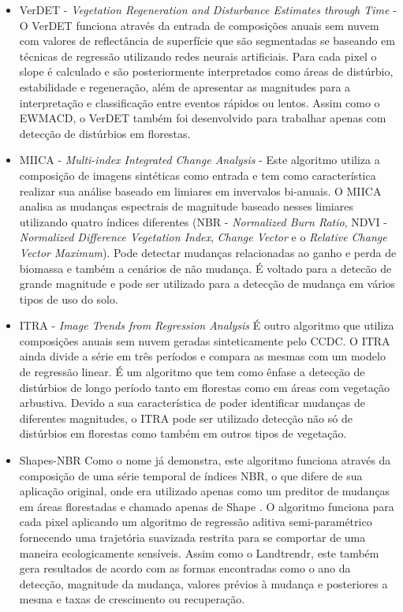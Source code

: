 \documentclass[12pt,a4paper]{article}
\begin{document}
\begin{itemize}
  \item VerDET - \textit{Vegetation Regeneration and Disturbance Estimates through Time} \citep{Hughes2017} - O VerDET funciona através da entrada de composições anuais sem nuvem com valores de reflectância de superfície que são segmentadas se baseando em técnicas de regressão utilizando redes neurais artificiais. Para cada pixel o slope é calculado e são posteriormente interpretados como áreas de distúrbio, estabilidade e regeneração, além de apresentar as magnitudes para a interpretação e classificação entre eventos rápidos ou lentos. Assim como o EWMACD, o VerDET também foi desenvolvido para trabalhar apenas com detecção de distúrbios em florestas.
  
  \item MIICA - \textit{Multi-index Integrated Change Analysis} \citep{JIN2013159} - Este algoritmo utiliza a composição de imagens sintéticas como entrada e tem como característica realizar sua análise baseado em limiares em invervalos bi-anuais. O MIICA analisa as mudanças espectrais de magnitude baseado nesses limiares utilizando quatro índices diferentes (NBR - \textit{Normalized Burn Ratio}, NDVI - \textit{Normalized Difference Vegetation Index}, \textit{Change Vector} e o \textit{Relative Change Vector Maximum}). Pode detectar mudanças relacionadas ao ganho e perda de biomassa e também a cenários de não mudança. É voltado para a detecão de grande magnitude e pode ser utilizado para a detecção de mudança em vários tipos de uso do solo.
  
  \item ITRA - \textit{Image Trends from Regression Analysis} \citep{VOGELMANN201292} É outro algoritmo que utiliza composições anuais sem nuvem geradas sinteticamente pelo CCDC. O ITRA ainda divide a série em três períodos e compara as mesmas com um modelo de regressão linear. É um algoritmo que tem como ênfase a detecção de distúrbios de longo período tanto em florestas como em áreas com vegetação arbustiva. Devido a sua característica de poder identificar mudanças de diferentes magnitudes, o ITRA pode ser utilizado detecção não só de distúrbios em florestas como também em outros tipos de vegetação.
  
  \item Shapes-NBR \citep{Meyer2013, Moisen2016} Como o nome já demonstra, este algoritmo funciona através da composição de uma série temporal de índices NBR, o que difere de sua aplicação original, onde era utilizado apenas como um preditor de mudanças em áreas florestadas e chamado apenas de Shape \citep{SCHROEDER2017230}. O algoritmo funciona para cada pixel aplicando um algoritmo de regressão aditiva semi-paramétrico fornecendo uma trajetória suavizada restrita para se comportar de uma maneira ecologicamente sensíveis. Assim como o Landtrendr, este também gera resultados de acordo com as formas encontradas como o ano da detecção, magnitude da mudança, valores prévios à mudança e posteriores a mesma e taxas de crescimento ou recuperação.
  
\end{itemize}
\end{document}
